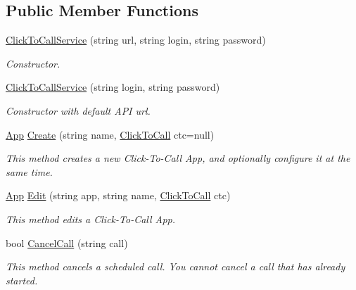 \subsection*{Public Member Functions}
\begin{DoxyCompactItemize}
\item 
\hyperlink{class_thecallr_api_1_1_services_1_1_client_1_1_click_to_call_service_adbf749e9f86a567ab83e4e2a0176ed81}{Click\+To\+Call\+Service} (string url, string login, string password)
\begin{DoxyCompactList}\small\item\em Constructor. \end{DoxyCompactList}\item 
\hyperlink{class_thecallr_api_1_1_services_1_1_client_1_1_click_to_call_service_ab05ce3979d1621442892ab4380e0e5d0}{Click\+To\+Call\+Service} (string login, string password)
\begin{DoxyCompactList}\small\item\em Constructor with default A\+P\+I url. \end{DoxyCompactList}\item 
\hyperlink{class_thecallr_api_1_1_objects_1_1_app_1_1_app}{App} \hyperlink{class_thecallr_api_1_1_services_1_1_client_1_1_click_to_call_service_aa802eeadd15f02633eaa5ad0dd6ee775}{Create} (string name, \hyperlink{class_thecallr_api_1_1_objects_1_1_click_to_call_1_1_click_to_call}{Click\+To\+Call} ctc=null)
\begin{DoxyCompactList}\small\item\em This method creates a new Click-\/\+To-\/\+Call App, and optionally configure it at the same time. \end{DoxyCompactList}\item 
\hyperlink{class_thecallr_api_1_1_objects_1_1_app_1_1_app}{App} \hyperlink{class_thecallr_api_1_1_services_1_1_client_1_1_click_to_call_service_af618a38f22756fcb2fba6b4123877694}{Edit} (string app, string name, \hyperlink{class_thecallr_api_1_1_objects_1_1_click_to_call_1_1_click_to_call}{Click\+To\+Call} ctc)
\begin{DoxyCompactList}\small\item\em This method edits a Click-\/\+To-\/\+Call App. \end{DoxyCompactList}\item 
bool \hyperlink{class_thecallr_api_1_1_services_1_1_client_1_1_click_to_call_service_aa5b46e4936b757775282c794905835a6}{Cancel\+Call} (string call)
\begin{DoxyCompactList}\small\item\em This method cancels a scheduled call. You cannot cancel a call that has already started. \end{DoxyCompactList}\item 

\end{DoxyCompactItemize}
